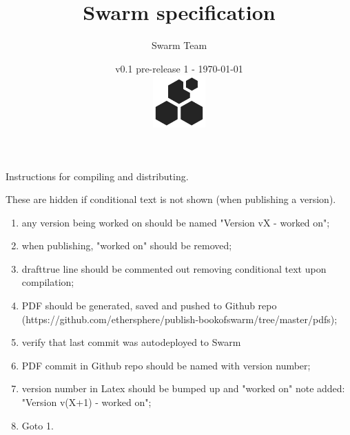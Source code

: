       
\makeglossaries
\title{\Huge\sc Swarm specification}
\author{Swarm Team}
\date{v0.1 pre-release 1 - \today\\
\vskip35pt\includegraphics[width=0.15\textwidth]{fig/logo.pdf}
}%

\frontmatter
\maketitle
\ifdraft
Instructions for compiling and distributing.

These are hidden if conditional text is not shown (when publishing a version).

\begin{enumerate}[noitemsep]
    \item any version being worked on should be named "Version vX - worked on";
    \item when publishing, "worked on" should be removed; 
    \item drafttrue line should be commented out removing conditional text upon compilation;
    \item PDF should be generated, saved and pushed to Github repo \\ (https://github.com/ethersphere/publish-bookofswarm/tree/master/pdfs); 
    \item verify that last commit was autodeployed to Swarm 
    \item PDF commit in Github repo should be named with version number;
    \item version number in Latex should be bumped up and "worked on" note added: "Version v(X+1) - worked on";
    \item Goto 1.
\end{enumerate}
\fi
%
\newpage{} 
{}
\tableofcontents
\newpage{} 
{}
\listoffigures
\listoftables %
\renewcommand{\listtheoremname}{List of definitions and theorems}
\label{sec:toc}

